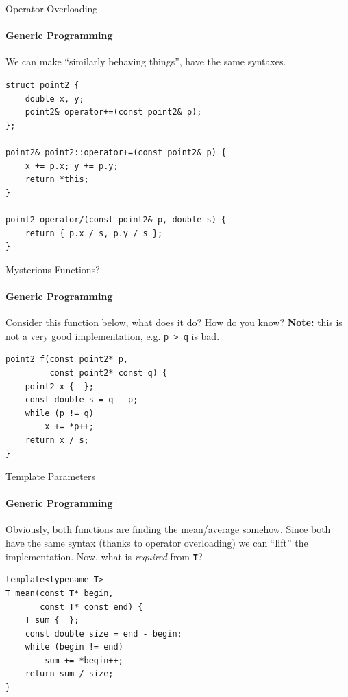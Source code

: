 \documentclass{beamer}
\begin{document}
    \begin{frame}[fragile]{Operator Overloading}
        \framesubtitle{Generic Programming}
        We can make ``similarly behaving things'', have the same syntaxes.
        \begin{center}
        \begin{lstlisting}[caption={boilerplate for the next example; a very incomplete point class.}]
struct point2 {
    double x, y;
    point2& operator+=(const point2& p);
};

point2& point2::operator+=(const point2& p) {
    x += p.x; y += p.y;
    return *this;
}

point2 operator/(const point2& p, double s) {
    return { p.x / s, p.y / s };
} \end{lstlisting}
        \end{center}
    \end{frame}

    \begin{frame}[fragile]{Mysterious Functions?}
        \framesubtitle{Generic Programming}
        Consider this function below, what does it do? How do you know? \textbf{Note:} this is not a very good implementation, e.g. \texttt{p > q} is bad.
        \begin{center}
        \begin{lstlisting}[caption={another mysterious, yet strangely familiar function (déjà vu?).}]
point2 f(const point2* p,
         const point2* const q) {
    point2 x {  };
    const double s = q - p;
    while (p != q)
        x += *p++;
    return x / s;
} \end{lstlisting}
        \end{center}
    \end{frame}

    \begin{frame}[fragile]{Template Parameters}
        \framesubtitle{Generic Programming}
        Obviously, both functions are finding the mean/average somehow. Since both have the same syntax (thanks to operator overloading) we can ``lift'' the implementation. Now, what is \emph{required} from \textbf{\texttt{T}}?
        \begin{center}
            \begin{lstlisting}[caption={natural generalization of the function from the previous slides.}]
template<typename T>
T mean(const T* begin,
       const T* const end) {
    T sum {  };
    const double size = end - begin;
    while (begin != end)
        sum += *begin++;
    return sum / size;
} \end{lstlisting}
        \end{center}
    \end{frame}
\end{document}
